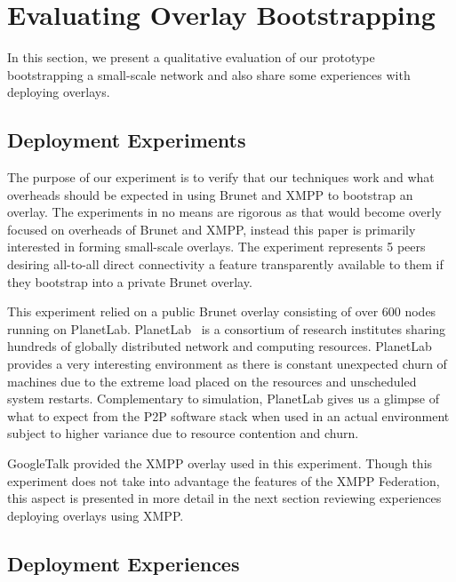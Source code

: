 \documentclass[conference]{IEEEtran}
\begin{document}
\section{Evaluating Overlay Bootstrapping}
\label{evaluations}
In this section, we present a qualitative evaluation of our prototype
bootstrapping a small-scale network and also share some experiences with
deploying overlays.

\subsection{Deployment Experiments}

The purpose of our experiment is to verify that our techniques work and what
overheads should be expected in using Brunet and XMPP to bootstrap an overlay.
The experiments in no means are rigorous as that would become overly focused on
overheads of Brunet and XMPP, instead this paper is primarily interested in
forming small-scale overlays.  The experiment represents 5 peers desiring
all-to-all direct connectivity a feature transparently available to them if
they bootstrap into a private Brunet overlay.

This experiment relied on a public Brunet overlay consisting of over 600 nodes
running on PlanetLab.  PlanetLab~\cite{planetlab} is a consortium of research
institutes sharing hundreds of globally distributed network and computing
resources.  PlanetLab provides a very interesting environment as there is
constant unexpected churn of machines due to the extreme load placed on the
resources and unscheduled system restarts.  Complementary to simulation,
PlanetLab gives us a glimpse of what to expect from the P2P software stack when
used in an actual environment subject to higher variance due to resource
contention and churn.

GoogleTalk provided the XMPP overlay used in this experiment.  Though this
experiment does not take into advantage the features of the XMPP Federation,
this aspect is presented in more detail in the next section reviewing
experiences deploying overlays using XMPP.

\subsection{Deployment Experiences}
\end{document}
